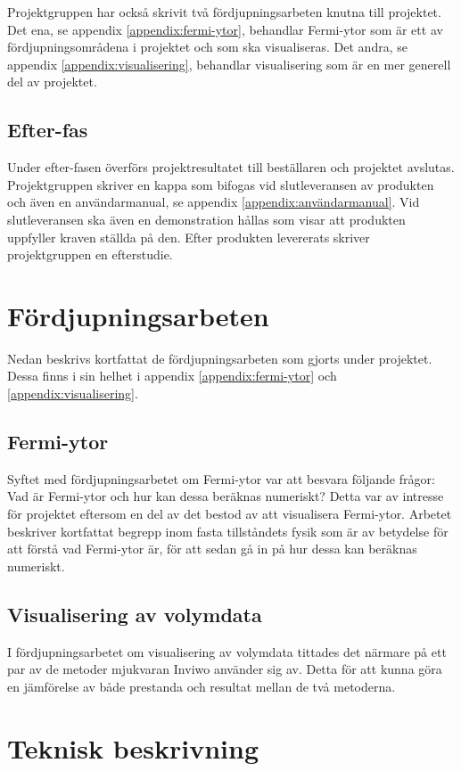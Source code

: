 \documentclass[a4paper,12pt]{article}
\begin{document}
Projektgruppen har också skrivit två fördjupningsarbeten knutna till projektet. Det ena, se appendix \ref{appendix:fermi-ytor}, behandlar Fermi-ytor som är ett av fördjupningsområdena i projektet och som ska visualiseras. Det andra, se appendix \ref{appendix:visualisering}, behandlar visualisering som är en mer generell del av projektet. 

\subsection{Efter-fas}
Under efter-fasen överförs projektresultatet till beställaren och projektet avslutas. Projektgruppen skriver en kappa som bifogas vid slutleveransen av produkten och även en användarmanual, se appendix \ref{appendix:användarmanual}. Vid slutleveransen ska
även en demonstration hållas som visar att produkten uppfyller kraven ställda på den. Efter produkten levererats skriver projektgruppen en efterstudie.

\section{Fördjupningsarbeten}
\label{ch:fördjupningsarbeten}
Nedan beskrivs kortfattat de fördjupningsarbeten som gjorts under projektet. Dessa finns i sin helhet i appendix \ref{appendix:fermi-ytor} och \ref{appendix:visualisering}. 
\subsection{Fermi-ytor}
Syftet med fördjupningsarbetet om Fermi-ytor var att besvara följande frågor: Vad är Fermi-ytor och hur kan dessa beräknas numeriskt? Detta var av intresse för projektet eftersom en del av det bestod av att visualisera Fermi-ytor. Arbetet beskriver kortfattat begrepp inom fasta tillståndets fysik som är av betydelse för att förstå vad Fermi-ytor är, för att sedan gå in på hur dessa kan beräknas numeriskt.

\subsection{Visualisering av volymdata}
I fördjupningsarbetet om visualisering av volymdata tittades det närmare på ett par av de metoder mjukvaran Inviwo använder sig av. Detta för att kunna göra en jämförelse av både prestanda och resultat mellan de två metoderna.
\section{Teknisk beskrivning}
\label{ch:teknisk-beskrivning}
\end{document}

